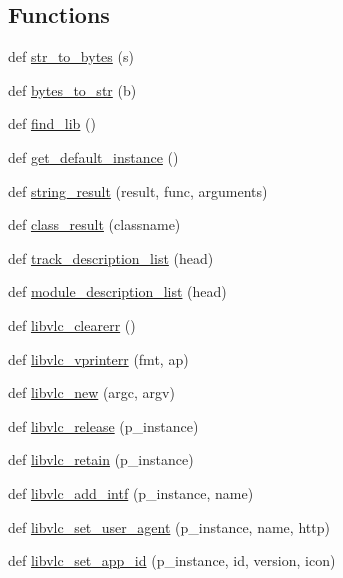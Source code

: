 \subsection*{Functions}
\begin{DoxyCompactItemize}
\item 
def \hyperlink{namespacevlc_a8cb85ab12eb35180b6cf2897d7847e46}{str\+\_\+to\+\_\+bytes} (s)
\item 
def \hyperlink{namespacevlc_acbb0aea5298eb7fbb31bea66b069b1b2}{bytes\+\_\+to\+\_\+str} (b)
\item 
def \hyperlink{namespacevlc_abf92ade0b4708a70f460beddb052b761}{find\+\_\+lib} ()
\item 
def \hyperlink{namespacevlc_a3e00cfbbf5aa7ede16e3877359d8212e}{get\+\_\+default\+\_\+instance} ()
\item 
def \hyperlink{namespacevlc_a6b173f59be4b100a9fef397e47cbdda1}{string\+\_\+result} (result, func, arguments)
\item 
def \hyperlink{namespacevlc_abd89c56c1c1f69dc7c4c602ed938d5b4}{class\+\_\+result} (classname)
\item 
def \hyperlink{namespacevlc_a7641c1329f78164fb94c4a89738ff38a}{track\+\_\+description\+\_\+list} (head)
\item 
def \hyperlink{namespacevlc_a0b7d068d11a5e7daf054d28358952cc3}{module\+\_\+description\+\_\+list} (head)
\item 
def \hyperlink{namespacevlc_ae40baed0009415ac5d90fe5fce6a0c7f}{libvlc\+\_\+clearerr} ()
\item 
def \hyperlink{namespacevlc_a0282aceb7f75c89abe13b1b3e31cf077}{libvlc\+\_\+vprinterr} (fmt, ap)
\item 
def \hyperlink{namespacevlc_a061db38b4ce8fdc316f730963401676c}{libvlc\+\_\+new} (argc, argv)
\item 
def \hyperlink{namespacevlc_acb9159355d8b06728e1c00a49ae25309}{libvlc\+\_\+release} (p\+\_\+instance)
\item 
def \hyperlink{namespacevlc_aeb98ef45d43c6f9348d8450963f08840}{libvlc\+\_\+retain} (p\+\_\+instance)
\item 
def \hyperlink{namespacevlc_ab8767ae6377ad6875f5034a12a4cd409}{libvlc\+\_\+add\+\_\+intf} (p\+\_\+instance, name)
\item 
def \hyperlink{namespacevlc_ac417c29edf981dc1f14649d41624e2b5}{libvlc\+\_\+set\+\_\+user\+\_\+agent} (p\+\_\+instance, name, http)
\item 
def \hyperlink{namespacevlc_a4d48c4354ffe3aa12ee4201cca0f0dac}{libvlc\+\_\+set\+\_\+app\+\_\+id} (p\+\_\+instance, id, version, icon)

\end{DoxyCompactItemize}
